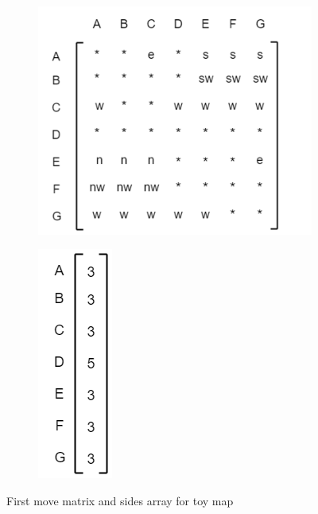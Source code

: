 \begin{figure}[h]
      \centering
      \begin{subfigure}{.35\columnwidth}
      \centering
      \includegraphics[width=.9\columnwidth]{cpd_square.png}
        \caption{}
        \label{fig:results_1}
      \end{subfigure}%
      \begin{subfigure}{.35\columnwidth}
      \includegraphics[width=.25\columnwidth]{sides_array.png}
      \centering
        \caption{}
        \label{fig:results_2}
      \end{subfigure}
      \caption{\small First move matrix and sides array for toy map}
      \label{fig:results}
    \end{figure}


